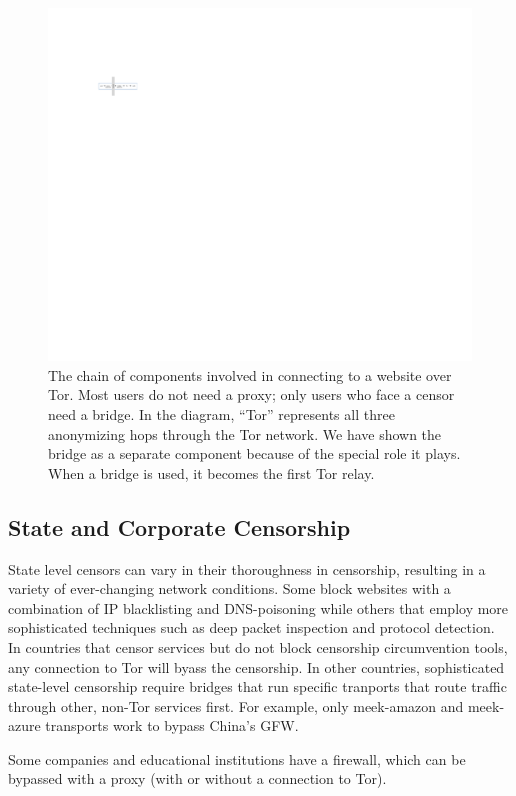 \documentclass[USenglish,oneside,twocolumn]{article}
\begin{document}
\begin{figure}
\centering
\includegraphics{topology.pdf}
\caption{
The chain of components involved in connecting to a website over Tor.
Most users do not need a proxy;
only users who face a censor need a bridge.
In the diagram, ``Tor'' represents all three anonymizing hops through the Tor network.
We have shown the bridge as a separate component
because of the special role it plays.
When a bridge is used, it becomes the first Tor relay.
}
\label{fig:topology}
\end{figure}

\subsection{State and Corporate Censorship}
State level censors can vary in their thoroughness in censorship, resulting in a variety of ever-changing network conditions. Some block websites with a combination of IP blacklisting and DNS-poisoning while others that employ more sophisticated techniques such as deep packet inspection and protocol detection. In countries that censor services but do not block censorship circumvention tools, any connection to Tor will byass the censorship. In other countries, sophisticated state-level censorship require bridges that run specific tranports that route traffic through other, non-Tor services first. For example, only meek-amazon and meek-azure transports work to bypass China's GFW. 

Some companies and educational institutions have a firewall, which can be bypassed with a proxy (with or without a connection to Tor). 
\end{document}
